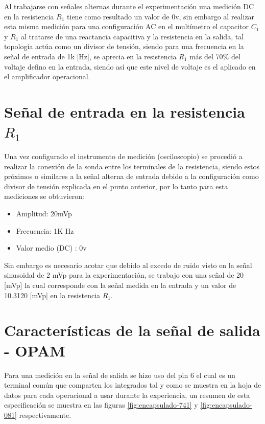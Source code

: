 Al trabajarse con señales alternas durante el experimentación una medición DC en la resistencia $R_1$ tiene como resultado un valor de 0v, sin embargo al realizar esta misma medición para una configuración AC en el multímetro el capacitor $C_1$ y $R_1$ al tratarse de una reactancia capacitiva y la resistencia en la salida, tal topología actúa como un divisor de tensión, siendo para una frecuencia en la señal de entrada de 1k [Hz], se aprecia en la resistencia $R_1$ más del 70\% del voltaje defino en la entrada, siendo así que este nivel de voltaje es el aplicado en el amplificador operacional.

\section{Señal de entrada en la resistencia $R_1$}

Una vez configurado el instrumento de medición (osciloscopio) se procedió a realizar la conexión de la sonda entre los terminales de la resistencia, siendo estos próximos o similares a la señal alterna de entrada debido a la configuración como divisor de tensión explicada en el punto anterior, por lo tanto para esta mediciones se obtuvieron:

\begin{itemize}
	\item Amplitud: 20mVp
	\item Frecuencia: 1K Hz
	\item Valor medio (DC) : 0v
\end{itemize}

Sin embargo es necesario acotar que debido al excedo de ruido visto en la señal sinusoidal de 2 mVp para la experimentación, se trabajo con una señal de 20 [mVp] la cual corresponde con la señal medida en la entrada y un valor de 10.3120 [mVp] en la resistencia $R_1$.

\section{Características de la señal de salida - OPAM}

Para una medición en la señal de salida se hizo uso del pin 6 el cual es un terminal común que comparten los integrados tal y como se muestra en la hoja de datos para cada operacional a usar durante la experiencia, un resumen de esta especificación se muestra en las figuras \ref{fig:encapsulado-741} y \ref{fig:encapsulado-081} respectivamente.


